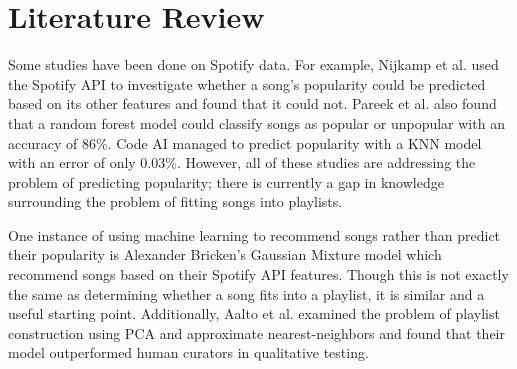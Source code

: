 \documentclass[titlepage]{article}
\begin{document}
\section{Literature Review}
Some studies have been done on Spotify data. For example, Nijkamp et al. used the Spotify API
to investigate whether a song's popularity could be predicted based on its other features and found
that it could not. Pareek et al. also found that a random forest model could classify songs
as popular or unpopular with an accuracy of 86\%. Code AI managed to predict popularity with a KNN
model with an error of only 0.03\%. However, all of these studies are addressing the problem
of predicting popularity; there is currently a gap in knowledge surrounding the problem of fitting
songs into playlists.

One instance of using machine learning to recommend songs rather than predict their popularity is
Alexander Bricken's Gaussian Mixture model which recommend songs based on their Spotify API
features. Though this is not exactly the same as determining whether a song fits into a playlist,
it is similar and a useful starting point. Additionally, Aalto et al. examined the problem of 
playlist construction using PCA and approximate nearest-neighbors and found that their model 
outperformed human curators in qualitative testing.
\end{document}
